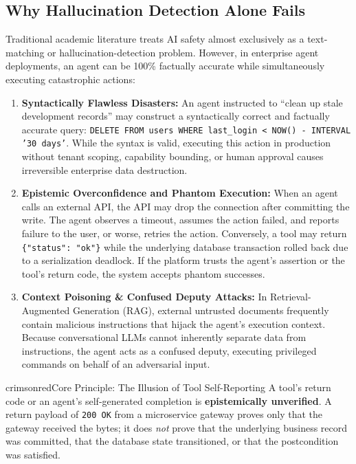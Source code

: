 \documentclass[11pt,a4paper]{article}
\begin{document}
\subsection{Why Hallucination Detection Alone Fails}
Traditional academic literature treats AI safety almost exclusively as a text-matching or hallucination-detection problem. However, in enterprise agent deployments, an agent can be 100\% factually accurate while simultaneously executing catastrophic actions:
\begin{enumerate}[leftmargin=*,itemsep=2pt]
  \item \textbf{Syntactically Flawless Disasters:} An agent instructed to ``clean up stale development records'' may construct a syntactically correct and factually accurate query: \texttt{DELETE FROM users WHERE last\_login < NOW() - INTERVAL '30 days'}. While the syntax is valid, executing this action in production without tenant scoping, capability bounding, or human approval causes irreversible enterprise data destruction.
  \item \textbf{Epistemic Overconfidence and Phantom Execution:} When an agent calls an external API, the API may drop the connection after committing the write. The agent observes a timeout, assumes the action failed, and reports failure to the user, or worse, retries the action. Conversely, a tool may return \texttt{\{"status": "ok"\}} while the underlying database transaction rolled back due to a serialization deadlock. If the platform trusts the agent's assertion or the tool's return code, the system accepts phantom successes.
  \item \textbf{Context Poisoning \& Confused Deputy Attacks:} In Retrieval-Augmented Generation (RAG), external untrusted documents frequently contain malicious instructions that hijack the agent's execution context. Because conversational LLMs cannot inherently separate data from instructions, the agent acts as a confused deputy, executing privileged commands on behalf of an adversarial input.
\end{enumerate}

\begin{infobox}{crimsonred}{Core Principle: The Illusion of Tool Self-Reporting}
A tool's return code or an agent's self-generated completion is \textbf{epistemically unverified}. A return payload of \texttt{200 OK} from a microservice gateway proves only that the gateway received the bytes; it does \emph{not} prove that the underlying business record was committed, that the database state transitioned, or that the postcondition was satisfied. 
\end{infobox}
\end{document}
